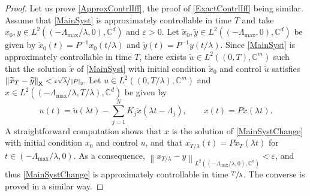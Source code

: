 \documentclass[10pt]{article}
\theoremstyle{plain}
\theoremstyle{definition}
\newcommand{\norm}[1]{\left\lVert #1\right\lVert}
\newcommand{\abs}[1]{\left\lvert #1\right \rvert}
\numberwithin{equation}{section}\numberwithin{figure}{section}\emergencystretch=3em
\begin{document}
\begin{proof}
Let us prove \eqref{ApproxContrlIff}, the proof of \eqref{ExactContrlIff} being similar. Assume that \eqref{MainSyst} is approximately controllable in time $T$ and take $x_0, y \in L^2((-\Lambda_{\max}/\lambda, 0), \mathbb C^d)$ and $\varepsilon > 0$. Let $\widetilde x_0, \widetilde{y} \in L^2((-\Lambda_{\max}, 0), \mathbb C^d)$ be given by $\widetilde x_0(t) = P^{-1} x_0(t/\lambda)$ and $\widetilde{y}(t) = P^{-1} y(t/\lambda)$. Since \eqref{MainSyst} is approximately controllable in time $T$, there exists $\widetilde u \in L^2((0, T), \mathbb C^m)$ such that the solution $\widetilde x$ of \eqref{MainSyst} with initial condition $\widetilde x_0$ and control $\widetilde u$ satisfies $\norm{\widetilde x_T - \widetilde{y}}_{\mathsf X} < \sfrac{\varepsilon \sqrt{\lambda}}{\abs{P}_{2}}$. Let $u \in L^2((0, T/\lambda), \mathbb C^m)$ and $x \in L^2((-\Lambda_{\max}/\lambda, T/\lambda), \mathbb C^d)$ be given by
\[
u(t) = \widetilde u(\lambda t) - \sum_{j=1}^N K_j \widetilde x(\lambda t - \Lambda_j), \qquad x(t) = P \widetilde x(\lambda t).
\]
A straightforward computation shows that $x$ is the solution of \eqref{MainSystChange} with initial condition $x_0$ and control $u$, and that $x_{T/\lambda}(t) = P \widetilde x_T(\lambda t)$ for $t \in (-\Lambda_{\max}/\lambda, 0)$. As a consequence,
$\norm{x_{T/\lambda} - y}_{L^2((-\Lambda_{\max}/\lambda, 0), \mathbb C^d)}  < \varepsilon$, and thus \eqref{MainSystChange} is approximately controllable in time $\sfrac{T}{\lambda}$. The converse is proved in a similar way.
\end{proof}
\end{document}
